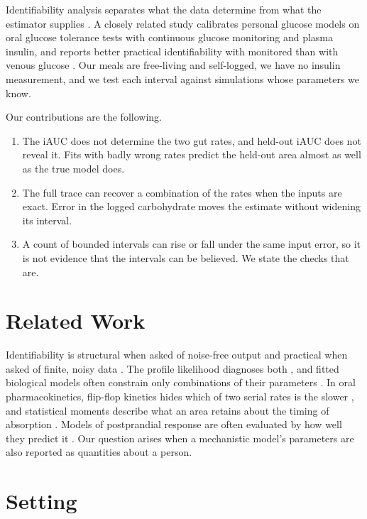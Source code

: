 \documentclass[letterpaper]{article} %
\begin{document}
Identifiability analysis separates what the data determine from what the estimator supplies \citep{cobelli1980parameter,miao2011identifiability,wieland2021structural}. A closely related study calibrates personal glucose models on oral glucose tolerance tests with continuous glucose monitoring and plasma insulin, and reports better practical identifiability with monitored than with venous glucose \citep{erdos2024leveraging}. Our meals are free-living and self-logged, we have no insulin measurement, and we test each interval against simulations whose parameters we know.

Our contributions are the following.
\begin{enumerate}
\item The iAUC does not determine the two gut rates, and held-out iAUC does not reveal it. Fits with badly wrong rates predict the held-out area almost as well as the true model does.
\item The full trace can recover a combination of the rates when the inputs are exact. Error in the logged carbohydrate moves the estimate without widening its interval.
\item A count of bounded intervals can rise or fall under the same input error, so it is not evidence that the intervals can be believed. We state the checks that are.
\end{enumerate}

\section{Related Work}

Identifiability is structural when asked of noise-free output and practical when asked of finite, noisy data \citep{cobelli1980parameter,miao2011identifiability,wieland2021structural}. The profile likelihood diagnoses both \citep{raue2009structural}, and fitted biological models often constrain only combinations of their parameters \citep{gutenkunst2007universally,eisenberg2014determining}. In oral pharmacokinetics, flip-flop kinetics hides which of two serial rates is the slower \citep{boxenbaum1998flipflop}, and statistical moments describe what an area retains about the timing of absorption \citep{yamaoka1978statistical,cutler1978theory}. Models of postprandial response are often evaluated by how well they predict it \citep{zeevi2015personalized,berry2020human}. Our question arises when a mechanistic model's parameters are also reported as quantities about a person.

\section{Setting}\label{sec:setting}
\end{document}
